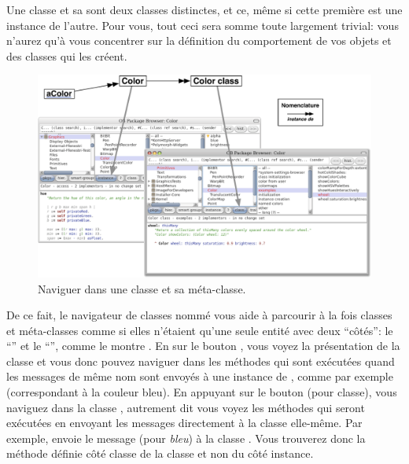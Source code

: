 \documentclass[a4paper,10pt,twoside]{book}
\begin{document}
Une classe et sa  sont deux classes distinctes, et ce, même si cette première est une instance de l'autre. Pour vous, tout ceci sera somme toute largement trivial: vous n'aurez qu'à vous concentrer sur la définition du comportement de vos objets et des classes qui les créent.

\begin{figure}[htb]
\begin{center}
\includegraphics[width=\textwidth]{Color-Buttons}
\caption{Naviguer dans une classe et sa méta-classe.
}
\end{center}
\end{figure}

De ce fait, le navigateur de classes nommé  vous
aide à parcourir à la fois classes et méta-classes comme si elles
n'étaient qu'une seule entité avec deux ``côtés'': le ``'' et le ``'', comme le montre . 
En \clickant{} sur le bouton , vous voyez la présentation de la classe  et vous donc pouvez naviguer dans les méthodes qui sont exécutées quand les messages de même nom sont envoyés à une instance de , comme par exemple  (correspondant à la couleur bleu). En appuyant
sur le bouton  (pour classe), vous naviguez dans la classe , autrement dit vous voyez les méthodes qui seront exécutées en envoyant les messages directement à la classe  elle-même.
Par exemple,  envoie le message  (pour \emph{bleu}) à la classe .
Vous trouverez donc la méthode  définie côté classe de la classe  et non du côté instance.
\end{document}
